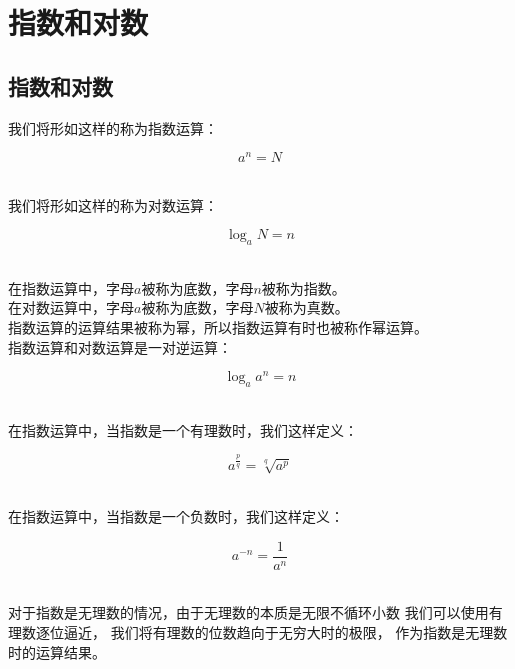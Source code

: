 \documentclass[UTF8]{ctexart}
\begin{document}
\newpage

\section{指数和对数}

\subsection{指数和对数}
    我们将形如这样的称为指数运算：
    \begin{large}
        \begin{equation*}
            a^n=N
        \end{equation*}
    \end{large}\\
    我们将形如这样的称为对数运算：
    \begin{large}
        \begin{equation*}
            \log_{a}{N}=n
        \end{equation*}
    \end{large}\\
    在指数运算中，字母$a$被称为底数，字母$n$被称为指数。\\[2mm]
    在对数运算中，字母$a$被称为底数，字母$N$被称为真数。\\[2mm]
    指数运算的运算结果被称为幂，所以指数运算有时也被称作幂运算。\\[3mm]
    指数运算和对数运算是一对逆运算：
    \begin{large}
        \begin{equation*}
            \log_{a}{a^n}=n
        \end{equation*}
    \end{large}\\
    在指数运算中，当指数是一个有理数时，我们这样定义：
    \begin{large}
        \begin{equation*}
            a^\frac{p}{q}=\sqrt[q]{a^p}
        \end{equation*}
    \end{large}\\
    在指数运算中，当指数是一个负数时，我们这样定义：
    \begin{large}
        \begin{equation*}
            a^{-n}=\frac{1}{a^n}
        \end{equation*}
    \end{large}\\
    对于指数是无理数的情况，由于无理数的本质是无限不循环小数
    我们可以使用有理数逐位逼近，
    我们将有理数的位数趋向于无穷大时的极限，
    作为指数是无理数时的运算结果。\\[3mm]
\end{document}

